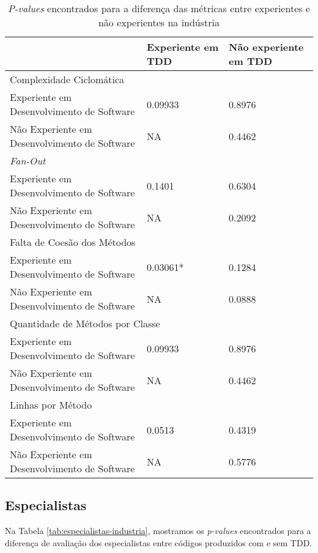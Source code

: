 \documentclass[conference]{IEEEtran}
\begin{document}
\begin{table}
	\centering
	\begin{tabular}{ | p{3cm} | p{2cm} | p{2cm} | }
		\hline
		  & Experiente em TDD & Não experiente em TDD \\
		\hline
			\multicolumn{3}{|l|}{Complexidade Ciclomática} \\
		\hline
			Experiente em Desenvolvimento de Software 		& 0.09933	&	0.8976\\
			\hline
			Não Experiente em Desenvolvimento de Software 	& NA		&	0.4462\\
		\hline
			\multicolumn{3}{|l|}{\textit{Fan-Out}}\\
		\hline
			Experiente em Desenvolvimento de Software 		& 0.1401	&	0.6304\\
			\hline
			Não Experiente em Desenvolvimento de Software 	& NA		&	0.2092\\
		\hline
			\multicolumn{3}{|l|}{Falta de Coesão dos Métodos}\\
		\hline
			Experiente em Desenvolvimento de Software 		& \cellcolor[gray]{0.8}0.03061*	&	0.1284\\
			\hline
			Não Experiente em Desenvolvimento de Software 	& NA		&	0.0888\\
		\hline
			\multicolumn{3}{|l|}{Quantidade de Métodos por Classe} \\
		\hline
			Experiente em Desenvolvimento de Software 		& 0.09933	&	0.8976\\
			\hline
			Não Experiente em Desenvolvimento de Software 	& NA		&	0.4462\\
		\hline
			\multicolumn{3}{|l|}{Linhas por Método}\\
		\hline
			Experiente em Desenvolvimento de Software 		& 0.0513	&	0.4319\\
			\hline
			Não Experiente em Desenvolvimento de Software 	& NA		&	0.5776\\
		\hline
	\end{tabular}
	\caption{\textit{P-values} encontrados para a diferença das métricas entre experientes e não experientes na indústria}
	\label{valores-separados}
\end{table}

\subsection{Especialistas}

Na Tabela
\ref{tab:especialistas-industria},
mostramos os \textit{p-values} encontrados para a diferença de avaliação dos especialistas
entre códigos produzidos com e sem TDD.
\end{document}
